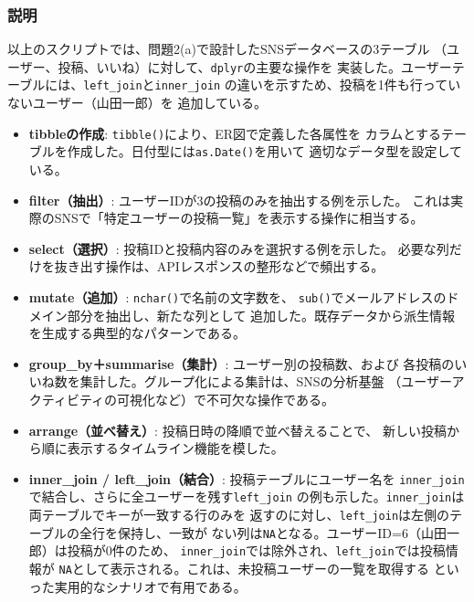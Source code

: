 \documentclass[12pt,a4paper]{ltjsarticle}
\begin{document}
\subsubsection{説明}
以上のスクリプトでは、問題2(a)で設計したSNSデータベースの3テーブル
（ユーザー、投稿、いいね）に対して、\texttt{dplyr}の主要な操作を
実装した。ユーザーテーブルには、\texttt{left\_join}と\texttt{inner\_join}
の違いを示すため、投稿を1件も行っていないユーザー（山田一郎）を
追加している。

\begin{itemize}[nosep]
    \item \textbf{tibbleの作成}: \texttt{tibble()}により、ER図で定義した各属性を
          カラムとするテーブルを作成した。日付型には\texttt{as.Date()}を用いて
          適切なデータ型を設定している。
    \item \textbf{filter（抽出）}: ユーザーIDが3の投稿のみを抽出する例を示した。
          これは実際のSNSで「特定ユーザーの投稿一覧」を表示する操作に相当する。
    \item \textbf{select（選択）}: 投稿IDと投稿内容のみを選択する例を示した。
          必要な列だけを抜き出す操作は、APIレスポンスの整形などで頻出する。
    \item \textbf{mutate（追加）}: \texttt{nchar()}で名前の文字数を、
          \texttt{sub()}でメールアドレスのドメイン部分を抽出し、新たな列として
          追加した。既存データから派生情報を生成する典型的なパターンである。
    \item \textbf{group\_by＋summarise（集計）}: ユーザー別の投稿数、および
          各投稿のいいね数を集計した。グループ化による集計は、SNSの分析基盤
          （ユーザーアクティビティの可視化など）で不可欠な操作である。
    \item \textbf{arrange（並べ替え）}: 投稿日時の降順で並べ替えることで、
          新しい投稿から順に表示するタイムライン機能を模した。
    \item \textbf{inner\_join / left\_join（結合）}: 投稿テーブルにユーザー名を
          \texttt{inner\_join}で結合し、さらに全ユーザーを残す\texttt{left\_join}
          の例も示した。\texttt{inner\_join}は両テーブルでキーが一致する行のみを
          返すのに対し、\texttt{left\_join}は左側のテーブルの全行を保持し、一致が
          ない列は\texttt{NA}となる。ユーザーID=6（山田一郎）は投稿が0件のため、
          \texttt{inner\_join}では除外され、\texttt{left\_join}では投稿情報が
          \texttt{NA}として表示される。これは、未投稿ユーザーの一覧を取得する
          といった実用的なシナリオで有用である。
\end{itemize}
\end{document}
